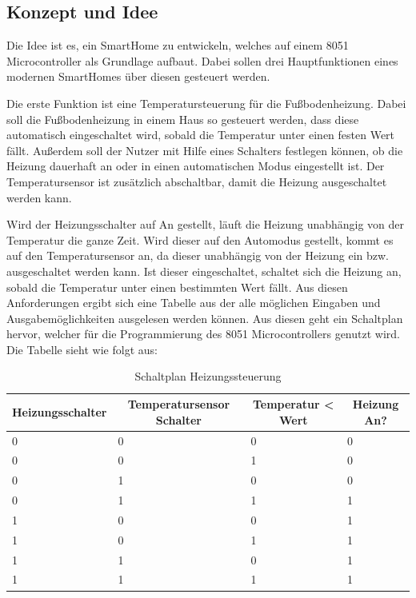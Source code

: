 \subsection{Konzept und Idee}

Die Idee ist es, ein SmartHome zu entwickeln, welches auf einem 8051 Microcontroller als Grundlage aufbaut. Dabei sollen drei Hauptfunktionen eines modernen SmartHomes über diesen gesteuert werden.

Die erste Funktion ist eine Temperatursteuerung für die Fußbodenheizung. Dabei soll die Fußbodenheizung in einem Haus so gesteuert werden, dass diese automatisch eingeschaltet wird, sobald die Temperatur unter einen festen Wert fällt. Außerdem soll der Nutzer mit Hilfe eines Schalters festlegen können, ob die Heizung dauerhaft an oder in einen automatischen Modus eingestellt ist. Der Temperatursensor ist zusätzlich abschaltbar, damit die Heizung ausgeschaltet werden kann.

Wird der Heizungsschalter auf An gestellt, läuft die Heizung unabhängig von der Temperatur die ganze Zeit. Wird dieser auf den Automodus gestellt, kommt es auf den Temperatursensor an, da dieser unabhängig von der Heizung ein bzw. ausgeschaltet werden kann. Ist dieser eingeschaltet, schaltet sich die Heizung an, sobald die Temperatur unter einen bestimmten Wert fällt.
Aus diesen Anforderungen ergibt sich eine Tabelle aus der alle möglichen Eingaben und Ausgabemöglichkeiten ausgelesen werden können. Aus diesen geht ein Schaltplan hervor, welcher für die Programmierung des 8051 Microcontrollers genutzt wird.
Die Tabelle sieht wie folgt aus:

\begin{table}[htbp]
\centering
\caption{Schaltplan Heizungssteuerung}
\label{my-label}
\begin{tabular}{|l|l|l|l|}
\hline
\multicolumn{1}{|c|}{\textbf{Heizungsschalter}} & \multicolumn{1}{c|}{\textbf{Temperatursensor Schalter}} & \multicolumn{1}{c|}{\textbf{Temperatur < Wert}} & \multicolumn{1}{c|}{\textbf{Heizung An?}} \\ \hline
 0 & 0 & 0 & 0 \\ \hline
 0 & 0 & 1 & 0 \\ \hline
 0 & 1 & 0 & 0 \\ \hline
 0 & 1 & 1 & 1 \\ \hline
 1 & 0 & 0 & 1 \\ \hline
 1 & 0 & 1 & 1 \\ \hline
 1 & 1 & 0 & 1 \\ \hline
 1 & 1 & 1 & 1 \\ \hline
\end{tabular}
\end{table}

